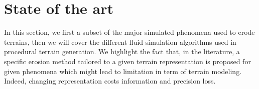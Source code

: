 






\section{State of the art}
\label{sec:erosion-state_of_the_art}
In this section, we first a subset of the major simulated phenomena used to erode terrains, then we will cover the different fluid simulation algorithms used in procedural terrain generation. We highlight the fact that, in the literature, a specific erosion method tailored to a given terrain representation is proposed for given phenomena which might lead to limitation in term of terrain modeling. Indeed, changing representation costs information and precision loss.


